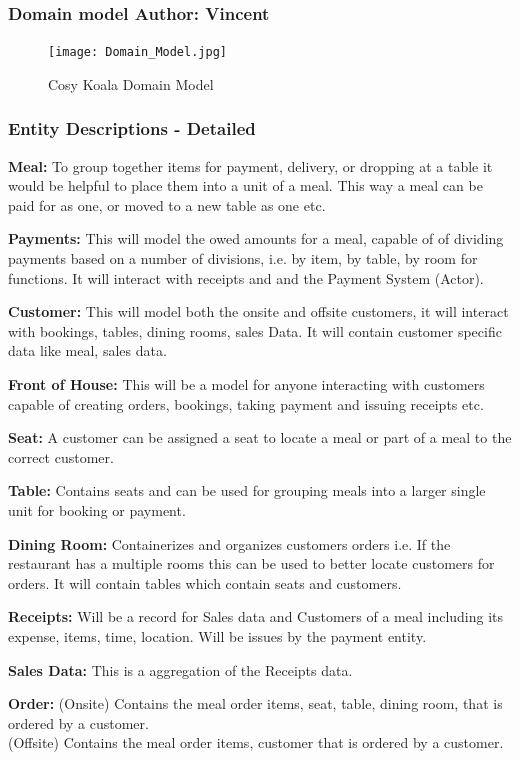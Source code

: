 \documentclass{article}
\begin{document}
\subsubsection{Domain model \normalsize\textbf{Author: Vincent}}
\begin{figure}[!ht]
    \centering
    \texttt{[image: Domain\_Model.jpg]}
    \caption{Cosy Koala Domain Model}
    \label{fig:Domain_Model}
\end{figure}

\subsubsection{Entity Descriptions - Detailed}
\textbf{Meal:} To group together items for payment, delivery, or dropping at a table it would be helpful to place them into a unit of a meal. This way a meal can be paid for as one, or moved to a new table as one etc.

\textbf{Payments:} This will model the owed amounts for a meal, capable of of dividing payments based on a number of divisions, i.e. by item, by table, by room for functions. It will interact with receipts and and the Payment System (Actor).

\textbf{Customer:} This will model both the onsite and offsite customers, it will interact with bookings, tables, dining rooms, sales Data. It will contain customer specific data like meal, sales data.

\textbf{Front of House:} This will be a model for anyone interacting with customers capable of creating orders, bookings, taking payment and issuing receipts etc.

\textbf{Seat:} A customer can be assigned a seat to locate a meal or part of a meal to the correct customer.

\textbf{Table:} Contains seats and can be used for grouping meals into a larger single unit for booking or payment.

\textbf{Dining Room:} Containerizes and organizes customers orders i.e. If the restaurant has a multiple rooms this can be used to better locate customers for orders. It will contain tables which contain seats and customers.

\textbf{Receipts:} Will be a record for Sales data and Customers of a meal including its expense, items, time, location. Will be issues by the payment entity.

\textbf{Sales Data:} This is a aggregation of the Receipts data.

\textbf{Order:} (Onsite) Contains the meal order items, seat, table, dining room, that is ordered by a customer. \\(Offsite) Contains the meal order items, customer that is ordered by a customer.
\end{document}
